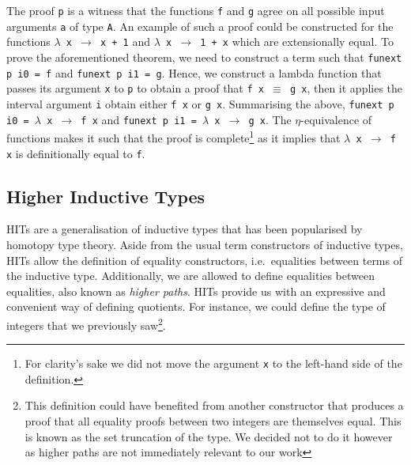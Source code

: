 \documentclass[12pt,twoside,maitrise]{dms}
\theoremstyle{definition}
\numberwithin{equation}{section}
\numberwithin{table}{chapter}
\numberwithin{figure}{chapter}
\newcommand\id[1] {\texttt{#1}}
\newcommand\fn[1] {\texttt{#1}}
\begin{document}
The proof \id{p} is a witness that the functions \id{f} and \id{g} agree on all
possible input arguments \id{a} of type \id{A}. An example of such a proof could
be constructed for the functions \fn{$\lambda$ x $\rightarrow$ x + 1} and
\fn{$\lambda$ x $\rightarrow$ 1 + x} which are extensionally equal. To prove the
aforementioned theorem, we need to construct a term such that \fn{funext p i0 =
  f} and \fn{funext p i1 = g}. Hence, we construct a lambda function that passes
its argument \id{x} to \id{p} to obtain a proof that \fn{f x $\equiv$ g x}, then
it applies the interval argument \id{i} obtain either \fn{f x} or \fn{g x}.
Summarising the above, \fn{funext p i0 = $\lambda$ x $\rightarrow$ f x} and
\fn{funext p i1 = $\lambda$ x $\rightarrow$ g x}. The $\eta$-equivalence of
functions makes it such that the proof is complete\footnote{For clarity's sake
we did not move the argument \id{x} to the left-hand side of the definition.} as
it implies that \fn{$\lambda$ x $\rightarrow$ f x} is definitionally equal to
\id{f}.



\subsection{Higher Inductive Types}

HITs are a generalisation of inductive types that has been popularised by
homotopy type theory\cite{HoTTbook}. Aside from the usual term constructors of
inductive types, HITs allow the definition of equality constructors,
i.e.\ equalities between terms of the inductive type. Additionally, we are
allowed to define equalities between equalities, also known as \emph{higher
paths}. HITs provide us with an expressive and convenient way of defining
quotients. For instance, we could define the type of integers that we previously
saw\footnote{This definition could have benefited from another constructor that
produces a proof that all equality proofs between two integers are themselves
equal. This is known as the set truncation of the type. We decided not to do it
however as higher paths are not immediately relevant to our work}.
\end{document}
